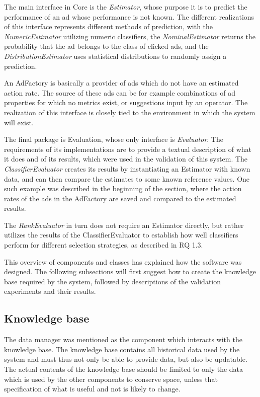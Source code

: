 \documentclass{sig-alternate}
\begin{document}
The main interface in Core is the \textit{Estimator}, whose purpose it is to predict the performance of an ad whose performance is not known. The different realizations of this interface represents different methods of prediction, with the \textit{NumericEstimator} utilizing numeric classifiers, the \textit{NominalEstimator} returns the probability that the ad belongs to the class of clicked ads, and the \textit{DistributionEstimator} uses statistical distributions to randomly assign a prediction.

An AdFactory is basically a provider of ads which do not have an estimated action rate. The source of these ads can be for example combinations of ad properties for which no metrics exist, or suggestions input by an operator. The realization of this interface is closely tied to the environment in which the system will exist.

The final package is Evaluation, whose only interface is \textit{Evaluator}. The requirements of its implementations are to provide a textual description of what it does and of its results, which were used in the validation of this system. The \textit{ClassifierEvaluator} creates its results by instantiating an Estimator with known data, and can then compare the estimates to some known reference values. One such example was described in the beginning of the section, where the action rates of the ads in the AdFactory are saved and compared to the estimated results.

The \textit{RankEvaluator} in turn does not require an Estimator directly, but rather utilizes the results of the ClassifierEvaluator to establish how well classifiers perform for different selection strategies, as described in RQ 1.3.

This overview of components and classes has explained how the software was designed. The following subsections will first suggest how to create the knowledge base required by the system, followed by descriptions of the validation experiments and their results.

\subsection{Knowledge base}
The data manager was mentioned as the component which interacts with the knowledge base. The knowledge base contains all historical data used by the system and must thus not only be able to provide data, but also be updatable. The actual contents of the knowledge base should be limited to only the data which is used by the other components to conserve space, unless that specification of what is useful and not is likely to change.
\end{document}
